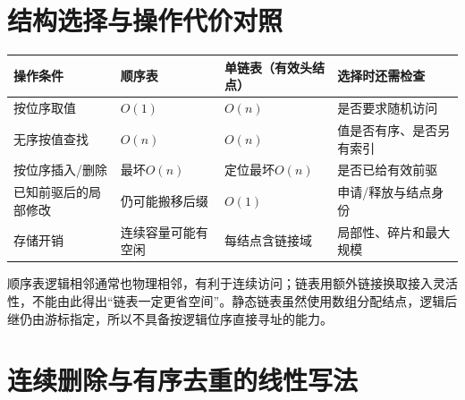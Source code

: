 \section{结构选择与操作代价对照}\label{DS02-compare}

\begin{wideblock}

\par\medskip\noindent\begin{minipage}{\linewidth}\fontsize{9.3}{12}\selectfont\begin{tabularx}{\linewidth}{@{}YYYY@{}}
\toprule\noalign{}
\begin{minipage}[b]{\linewidth}\raggedright
操作条件
\end{minipage} & \begin{minipage}[b]{\linewidth}\raggedright
顺序表
\end{minipage} & \begin{minipage}[b]{\linewidth}\raggedright
单链表（有效头结点）
\end{minipage} & \begin{minipage}[b]{\linewidth}\raggedright
选择时还需检查
\end{minipage} \\
\midrule\noalign{}


按位序取值 & \(O(1)\) & \(O(n)\) & 是否要求随机访问 \\
无序按值查找 & \(O(n)\) & \(O(n)\) & 值是否有序、是否另有索引 \\
按位序插入/删除 & 最坏\(O(n)\) & 定位最坏\(O(n)\) & 是否已给有效前驱 \\
已知前驱后的局部修改 & 仍可能搬移后缀 & \(O(1)\) & 申请/释放与结点身份 \\
存储开销 & 连续容量可能有空闲 & 每结点含链接域 & 局部性、碎片和最大规模 \\
\bottomrule\end{tabularx}
\end{minipage}\par\medskip

\end{wideblock}

顺序表逻辑相邻通常也物理相邻，有利于连续访问；链表用额外链接换取接入灵活性，不能由此得出``链表一定更省空间''。静态链表虽然使用数组分配结点，逻辑后继仍由游标指定，所以不具备按逻辑位序直接寻址的能力。

\section{连续删除与有序去重的线性写法}\label{DS02-filter}

